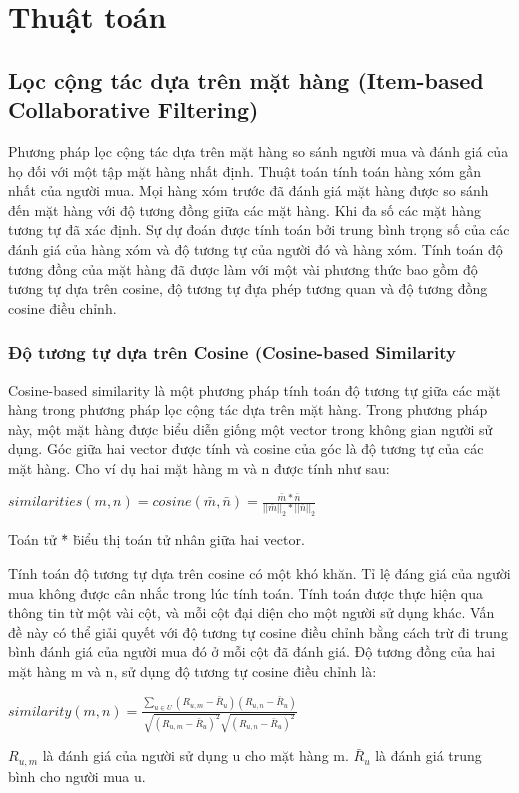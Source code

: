 \chapter{Thuật toán}
\section{Lọc cộng tác dựa trên mặt hàng (Item-based Collaborative Filtering)}
Phương pháp lọc cộng tác dựa trên mặt hàng so sánh người mua và đánh giá của họ đối với một tập mặt hàng nhất định. Thuật toán tính toán hàng xóm gần nhất của người mua. Mọi hàng xóm trước đã đánh giá mặt hàng được so sánh đến mặt hàng với độ tương đồng giữa các mặt hàng. Khi đa số các mặt hàng tương tự đã xác định. Sự dự đoán được tính toán bởi trung bình trọng số của các đánh giá của hàng xóm và độ tương tự của người đó và hàng xóm. Tính toán độ tương đồng của mặt hàng đã được làm với một vài phương thức bao gồm độ tương tự dựa trên cosine, độ tương tự đựa phép tương quan và độ tương đồng cosine điều chỉnh.
\subsection{Độ tương tự dựa trên Cosine (Cosine-based Similarity}
Cosine-based similarity là một phương pháp tính toán độ tương tự giữa các mặt hàng trong phương pháp lọc cộng tác dựa trên mặt hàng. Trong phương pháp này, một mặt hàng được biểu diễn giống một vector trong không gian người sử dụng. Góc giữa hai vector được tính và cosine của góc là độ tương tự của các mặt hàng. Cho ví dụ hai mặt hàng m và n được tính như sau:
\begin{center}
$similarities(m, n) = cosine(\bar{m},\bar{n}) = \frac{\bar{m}*\bar{n}}{||\bar{m}||_{2}*||\bar{n}||_{2}}$
\end{center}
Toán tử \" * \" biểu thị toán tử nhân giữa hai vector.

Tính toán độ tương tự dựa trên cosine có một khó khăn. Tỉ lệ đáng giá của người mua không được cân nhắc trong lúc tính toán. Tính toán được thực hiện qua thông tin từ một vài cột, và mỗi cột đại diện cho một người sử dụng khác. Vấn đề này có thể giải quyết với độ tương tự cosine điều chỉnh bằng cách trừ đi trung bình đánh giá của người mua đó ở mỗi cột đã đánh giá. Độ tương đồng của hai mặt hàng m và n, sử dụng độ tương tự cosine điều chỉnh là:
\begin{center}
$similarity(m, n) = \frac{\sum_{u\in U}(R_{u,m}-\bar{R}_{u})(R_{u,n}-\bar{R}_{u})}{\sqrt{(R_{u,m} - \bar{R}_u)^{2}} \sqrt{(R_{u,n} - \bar{R}_u)^{2}}}$
\end{center}
$R_{u,m}$ là đánh giá của người sử dụng u cho mặt hàng m.
$\bar{R}_{u}$ là đánh giá trung bình cho người mua u.

